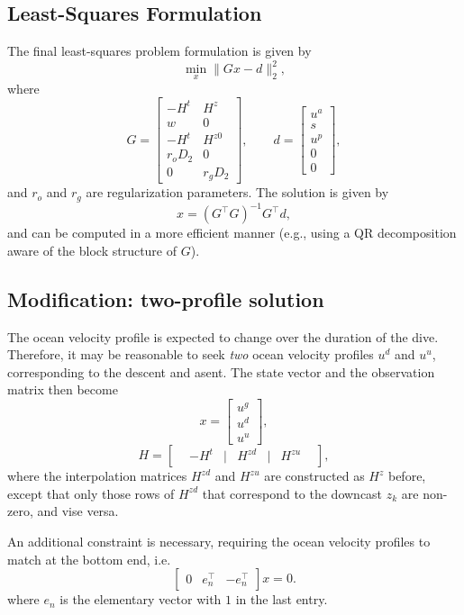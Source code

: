 \subsection {Least-Squares Formulation}
The final least-squares problem formulation is given by 
$$
\min_x{\|{Gx-d}\|_2^2},
$$
where
$$
G=
\begin{bmatrix}
-H^t  &H^z \\
w & 0\\
 -H^t & H^{z0}\\
r_o D_2 & 0 \\
0  & r_gD_2
\end{bmatrix}, \qquad 
d=\begin{bmatrix}{u^a}\\ s\\  u^p \\ 0 \\ 0  \end{bmatrix},
$$
and $r_o$ and $r_g$ are regularization parameters.
The solution is given by
$$
x=(G^\top G)^{-1}G^\top d,
$$
and can be computed in a more efficient manner (e.g., using a QR decomposition aware of the block structure of $G$).
\subsection {Modification: two-profile solution}
The ocean velocity profile is expected to change over the duration of the dive. Therefore, it may be reasonable to seek \emph{two} ocean velocity profiles $u^d$ and $u^u$, corresponding to the descent and asent. The state vector and the observation matrix then become
$$x=\begin{bmatrix}
{u^g} \\ 
u^d \\
u^u 
\end{bmatrix},$$
$$
H= \begin{bmatrix}
&-H^t&|&H^{zd} &|&H^{zu} &\end{bmatrix},
$$
where the interpolation matrices $H^{zd}$ and $H^{zu}$ are constructed as $H^{z}$ before, except that only those rows of $H^{zd}$ that correspond to the downcast $z_k$ are non-zero, and vise versa. 

An additional constraint is necessary, requiring the ocean velocity profiles to match at the bottom end, i.e.
$$
\begin{bmatrix}
0 & e_n^\top & -e_n^\top
\end{bmatrix}x=0.
$$
where $e_n$ is the elementary vector with $1$ in the last entry. 

